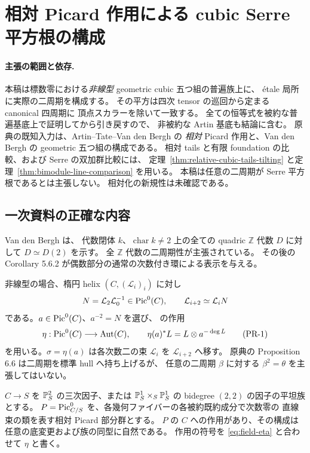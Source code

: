\section{相対 Picard 作用による cubic Serre 平方根の構成}
\label{sec:relative-picard-roots}

\paragraph{主張の範囲と依存.}
本稿は標数零における\emph{非線型} geometric cubic 五つ組の普遍族上に、
étale 局所に実際の二周期を構成する。
その平方は四次 tensor の巡回から定まる canonical 四周期に
頂点スカラーを除いて一致する。
全ての恒等式を被約な普遍基底上で証明してから引き戻すので、
非被約な Artin 基底も結論に含む。
原典の既知入力は、Artin--Tate--Van den Bergh の
\emph{相対} Picard 作用と、Van den Bergh の geometric 五つ組の構成である。
相対 tails と有限 foundation の比較、および Serre の双加群比較には、
定理~\ref{thm:relative-cubic-tails-tilting} と定理~\ref{thm:bimodule-line-comparison} を用いる。
本稿は任意の二周期が Serre 平方根であるとは主張しない。
相対化の新規性は未確認である。

\subsection{一次資料の正確な内容}

Van den Bergh \cite[Proposition 5.6.1]{VdB2011} は、
代数閉体 $k$、$\operatorname{char}k\ne2$ 上の全ての quadric
$\mathbb Z$ 代数 $D$ に対して $D\simeq D(2)$ を示す。
全 $\mathbb Z$ 代数の二周期性が主張されている。
その後の Corollary 5.6.2 が偶数部分の通常の次数付き環による表示を与える。

非線型の場合、楕円 helix $(C,(\mathcal L_i)_i)$ に対し
\[
 N=\mathcal L_2\mathcal L_0^{-1}\in\operatorname{Pic}^0(C),\qquad
 \mathcal L_{i+2}\simeq\mathcal L_iN
\]
である。$a\in\operatorname{Pic}^0(C)$、$a^{-2}=N$ を選び、
\cite[Theorem 4.2.3]{VdB2011} の作用
\[
 \eta:\operatorname{Pic}^0(C)\longrightarrow\operatorname{Aut}(C),\qquad
 \eta(a)^*L=L\otimes a^{-\deg L}
 \tag{PR-1}\label{eq:field-eta}
\]
を用いる。$\sigma=\eta(a)$ は各次数二の束 $\mathcal L_i$ を $\mathcal L_{i+2}$ へ移す。
原典の Proposition 6.6 は二周期を標準 hull へ持ち上げるが、
任意の二周期 $\beta$ に対する $\beta^2=\theta$ を主張してはいない。

\begin{proposition}\label{prop:ATV-relative-action}
$C\to S$ を $\mathbb P^2_S$ の三次因子、または
$\mathbb P^1_S\times_S\mathbb P^1_S$ の bidegree $(2,2)$ の因子の平坦族とする。
$P=\operatorname{Pic}^0_{C/S}$ を、各幾何ファイバーの各被約既約成分で次数零の
直線束の類を表す相対 Picard 部分群とする。
$P$ の $C$ への作用があり、その構成は任意の底変更および族の同型に自然である。
作用の符号を \eqref{eq:field-eta} と合わせて $\eta$ と書く。
\end{proposition}

